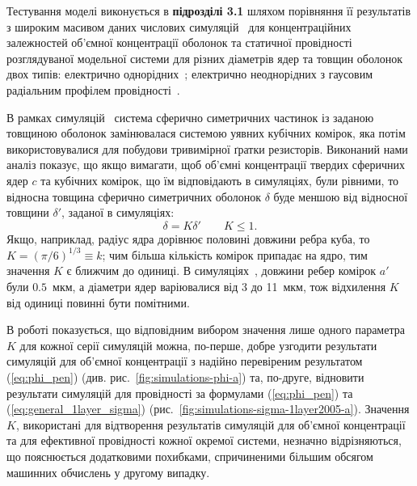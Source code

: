 \documentclass[twoside,a4paper,14pt]{vakaref-utf8}
\begin{document}
Тестування моделі виконується в {\bf підрозділі 3.1} шляхом порівняння її результатів з широким масивом даних числових симуляцій~\cite{Siekierski2005, Siekierski2006, Siekierski2007} для концентраційних залежностей об'ємної концентрації оболонок та статичної провідності розглядуваної модельної системи для різних діаметрів ядер та товщин оболонок двох типів: електрично однорідних~\cite{Siekierski2005, Siekierski2007}; електрично неоднорiдних з гаусовим радіальним профілем провідності~\cite{Siekierski2006}.

В рамках симуляцій~\cite{Siekierski2005, Siekierski2006, Siekierski2007} система сферично симетричних частинок із заданою товщиною оболонок замінювалася системою уявних кубічних комірок, яка потім використовувалися для побудови тривимірної ґратки резисторів. Виконаний нами аналіз показує, що якщо вимагати, щоб об'ємні концентрації твердих сферичних ядер $c$ та кубічних комірок, що їм відповідають в симуляціях, були рівними, то відносна товщина сферично симетричних оболонок $\delta$ буде меншою від відносної товщини $\delta'$, заданої в симуляціях:
\begin{equation}\label{eq:K-delta-def}
\delta = K \delta' \qquad K \leq 1.
\end{equation}
Якщо, наприклад, радіус ядра дорівнює половині довжини ребра куба, то $K=(\pi/6)^{1/3}\equiv k$; чим більша кількість комірок припадає на ядро, тим значення $K$ є ближчим до одиниці. 
В симуляціях~\cite{Siekierski2005, Siekierski2006, Siekierski2007}, довжини ребер комірок $a'$ були $0.5$~мкм, а діаметри ядер варіювалися від 3 до 11~мкм, тож відхилення $K$ від одиниці повинні бути помітними. 

В роботі  показується, що  відповідним вибором значення лише одного параметра $K$  для кожної серії симуляцій можна, по-перше, добре узгодити результати симуляцій для об'ємної концентрації з надійно перевіреним результатом (\ref{eq:phi_pen}) (див. рис.~\ref{fig:simulations-phi-a}) та, по-друге, відновити результати симуляцій для провідності за формулами (\ref{eq:phi_pen}) та (\ref{eq:general_1layer_sigma})  (рис.~\ref{fig:simulations-sigma-1layer2005-a}).
Значення $K$, використані для відтворення результатів  симуляцій для об'ємної концентрації та для ефективної провідності кожної окремої системи, незначно відрізняються, що пояснюється додатковими похибками, спричиненими більшим обсягом машинних обчислень у другому випадку.
\end{document}
